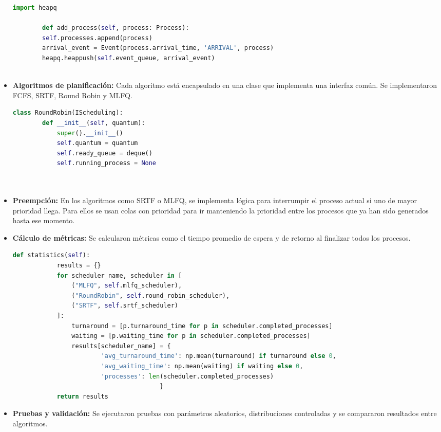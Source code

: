 \documentclass[12pt]{article}
\begin{document}
\begin{itemize}
	\begin{lstlisting}[language=Python, caption={Cola de eventos con heapq}]
		import heapq
		
		def add_process(self, process: Process):
		self.processes.append(process)
		arrival_event = Event(process.arrival_time, 'ARRIVAL', process)
		heapq.heappush(self.event_queue, arrival_event)
		
	\end{lstlisting}
	
	\item \textbf{Algoritmos de planificación:} Cada algoritmo está encapsulado en una clase que implementa una interfaz común. Se implementaron FCFS, SRTF, Round Robin y MLFQ.
	
	\begin{lstlisting}[language=Python, caption={Ejemplo de Round Robin}]
		class RoundRobin(IScheduling):
		def __init__(self, quantum):
			super().__init__()
			self.quantum = quantum
			self.ready_queue = deque()
			self.running_process = None  
			
			
	\end{lstlisting}
	
	\item \textbf{Preempción:} En los algoritmos como SRTF o MLFQ, se implementa lógica para interrumpir el proceso actual si uno de mayor prioridad llega. Para ellos se usan colas con prioridad para ir manteniendo la prioridad entre los procesos que ya han sido generados hasta ese momento.
	
	\item \textbf{Cálculo de métricas:} Se calcularon métricas como el tiempo promedio de espera y de retorno al finalizar todos los procesos.
	
	\begin{lstlisting}[language=Python, caption={Tiempo de espera promedio}]
		def statistics(self):
			results = {}
			for scheduler_name, scheduler in [
				("MLFQ", self.mlfq_scheduler),
				("RoundRobin", self.round_robin_scheduler),
				("SRTF", self.srtf_scheduler)
			]:
				turnaround = [p.turnaround_time for p in scheduler.completed_processes]
				waiting = [p.waiting_time for p in scheduler.completed_processes]
				results[scheduler_name] = {
						'avg_turnaround_time': np.mean(turnaround) if turnaround else 0,
						'avg_waiting_time': np.mean(waiting) if waiting else 0,
						'processes': len(scheduler.completed_processes)
										}
			return results
	\end{lstlisting}
	
	\item \textbf{Pruebas y validación:} Se ejecutaron pruebas con parámetros aleatorios, distribuciones controladas y se compararon resultados entre algoritmos.
	
	
\end{itemize}
\end{document}
